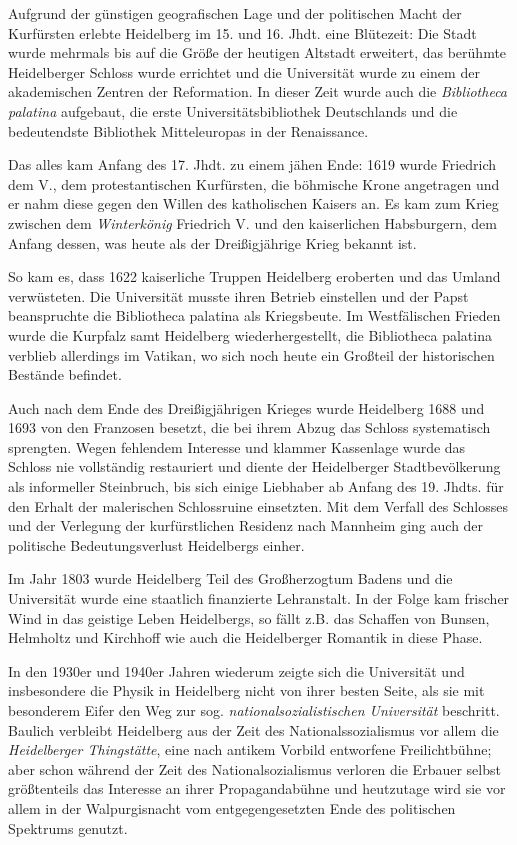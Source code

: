 Aufgrund der günstigen geografischen Lage und der politischen Macht der Kurfürsten erlebte Heidelberg im 15. und 16. Jhdt. eine Blütezeit: Die Stadt wurde mehrmals bis auf die Größe der heutigen Altstadt erweitert, das berühmte Heidelberger Schloss wurde errichtet und die Universität wurde zu einem der akademischen Zentren der Reformation. In dieser Zeit wurde auch die \textit{Bibliotheca palatina} aufgebaut, die erste Universitätsbibliothek Deutschlands und die bedeutendste Bibliothek Mitteleuropas in der Renaissance.

Das alles kam Anfang des 17. Jhdt. zu einem jähen Ende: 1619 wurde Friedrich dem V., dem protestantischen Kurfürsten, die böhmische Krone angetragen und er nahm diese gegen den Willen des katholischen Kaisers an. Es kam zum Krieg zwischen dem \textit{Winterkönig} Friedrich V. und den kaiserlichen Habsburgern, dem Anfang dessen, was heute als der Dreißigjährige Krieg bekannt ist.

So kam es, dass 1622 kaiserliche Truppen Heidelberg eroberten und das Umland verwüsteten. Die Universität musste ihren Betrieb einstellen und der Papst beanspruchte die Bibliotheca palatina als Kriegsbeute. Im Westfälischen Frieden wurde die Kurpfalz samt Heidelberg wiederhergestellt, die Bibliotheca palatina verblieb allerdings im Vatikan, wo sich noch heute ein Großteil der historischen Bestände befindet.

Auch nach dem Ende des Dreißigjährigen Krieges wurde Heidelberg 1688 und 1693 von den Franzosen besetzt, die bei ihrem Abzug das Schloss systematisch sprengten. Wegen fehlendem Interesse und klammer Kassenlage wurde das Schloss nie vollständig restauriert und diente der Heidelberger Stadtbevölkerung als informeller Steinbruch, bis sich einige Liebhaber ab Anfang des 19. Jhdts. für den Erhalt der malerischen Schlossruine einsetzten. Mit dem Verfall des Schlosses und der Verlegung der kurfürstlichen Residenz nach Mannheim ging auch der politische Bedeutungsverlust Heidelbergs einher.

Im Jahr 1803 wurde Heidelberg Teil des Großherzogtum Badens und die Universität wurde eine staatlich finanzierte Lehranstalt. In der Folge kam frischer Wind in das geistige Leben Heidelbergs, so fällt z.B. das Schaffen von Bunsen, Helmholtz und Kirchhoff wie auch die Heidelberger Romantik in diese Phase.

In den 1930er und 1940er Jahren wiederum zeigte sich die Universität und insbesondere die Physik in Heidelberg nicht von ihrer besten Seite, als sie mit besonderem Eifer den Weg zur sog. \textit{nationalsozialistischen Universität} beschritt. Baulich verbleibt Heidelberg aus der Zeit des Nationalssozialismus vor allem die \textit{Heidelberger Thingstätte}, eine nach antikem Vorbild entworfene Freilichtbühne; aber schon während der Zeit des Nationalsozialismus verloren die Erbauer selbst größtenteils das Interesse an ihrer Propagandabühne und heutzutage wird sie vor allem in der Walpurgisnacht vom entgegengesetzten Ende des politischen Spektrums genutzt.

